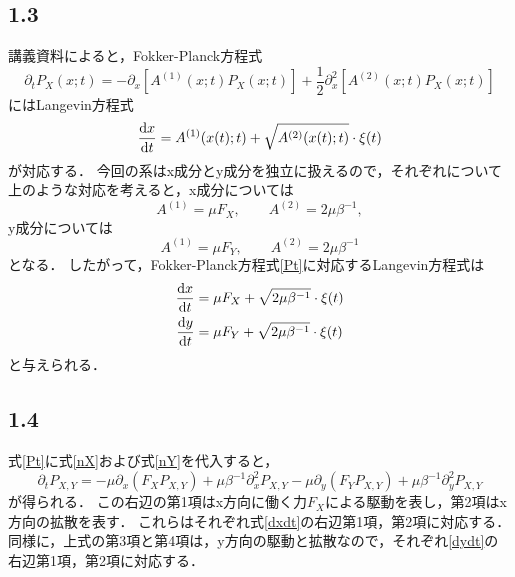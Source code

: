 \documentclass[a4paper,11pt]{jsarticle}
\begin{document}
\subsection*{1.3}
講義資料によると，Fokker-Planck方程式
\begin{equation}
  \partial_t P_X(x;t) = - \partial_x [A^{(1)}(x;t)P_X(x;t)] + \frac{1}{2} \partial_x^2 [A^{(2)}(x;t)P_X(x;t)]
\end{equation}
にはLangevin方程式
\begin{equation}
  \dv{x}{t} = A^{(1)}(x(t);t) + \sqrt{A^{(2)}(x(t);t)}\cdot \xi(t)
\end{equation}
が対応する．
今回の系はx成分とy成分を独立に扱えるので，それぞれについて上のような対応を考えると，x成分については
\begin{equation}
  A^{(1)} = \mu F_X, \qquad A^{(2)} = 2\mu\beta^{-1},
\end{equation}
y成分については
\begin{equation}
  A^{(1)} = \mu F_Y, \qquad A^{(2)} = 2\mu\beta^{-1}
\end{equation}
となる．
したがって，Fokker-Planck方程式\eqref{Pt}に対応するLangevin方程式は
\begin{align}
  \dv{x}{t} &= \mu F_X + \sqrt{2\mu \beta^{-1}} \cdot \xi(t) \label{dxdt}\\
  \dv{y}{t} &= \mu F_Y + \sqrt{2\mu \beta^{-1}} \cdot \xi(t) \label{dydt}
\end{align}
と与えられる．

\subsection*{1.4}
式\eqref{Pt}に式\eqref{nX}および式\eqref{nY}を代入すると，
\begin{equation}
  \partial_t P_{X,Y} = - \mu \partial_x (F_X P_{X,Y}) + \mu \beta^{-1} \partial_x^2 P_{X,Y}  - \mu \partial_y (F_Y P_{X,Y})+ \mu \beta^{-1} \partial_y^2 P_{X,Y}  
\end{equation}
が得られる．
この右辺の第1項はx方向に働く力$F_X$による駆動を表し，第2項はx方向の拡散を表す．
これらはそれぞれ式\eqref{dxdt}の右辺第1項，第2項に対応する．
同様に，上式の第3項と第4項は，y方向の駆動と拡散なので，それぞれ\eqref{dydt}の右辺第1項，第2項に対応する．
\end{document}
